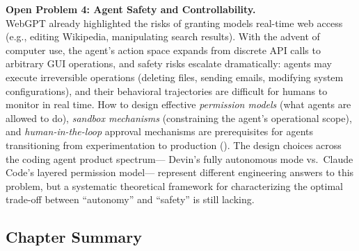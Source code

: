 \begin{openproblembox}
\textbf{Open Problem 4: Agent Safety and Controllability.}\\
WebGPT already highlighted the risks of granting models real-time web access
(e.g., editing Wikipedia, manipulating search results).
With the advent of computer use,
the agent's action space expands from discrete API calls to arbitrary GUI operations,
and safety risks escalate dramatically:
agents may execute irreversible operations (deleting files, sending emails, modifying system configurations),
and their behavioral trajectories are difficult for humans to monitor in real time.
How to design effective \emph{permission models} (what agents are allowed to do),
\emph{sandbox mechanisms} (constraining the agent's operational scope), and
\emph{human-in-the-loop} approval mechanisms
are prerequisites for agents transitioning from experimentation to production
().
The design choices across the coding agent product spectrum---
Devin's fully autonomous mode vs.\ Claude Code's layered permission model---
represent different engineering answers to this problem,
but a systematic theoretical framework
for characterizing the optimal trade-off between ``autonomy'' and ``safety'' is still lacking.
\end{openproblembox}


\subsection{Chapter Summary}

